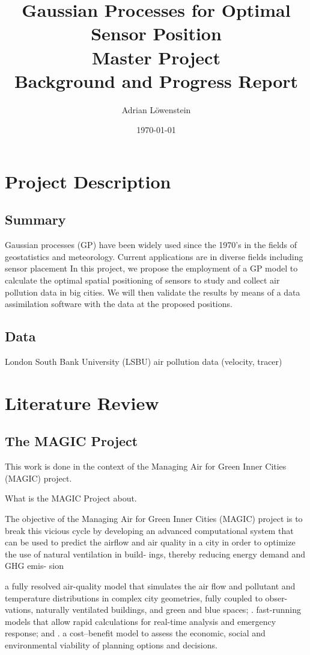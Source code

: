 \documentclass[11pt,a4paper]{article}
\title{Gaussian Processes for Optimal Sensor Position \\
Master Project \\
Background and Progress Report 
}							%
\author{Adrian Löwenstein}								%
\date{\today}											%
\numberwithin{equation}{section}
\begin{document}
\maketitle
\pagebreak

\section{Project Description}

\subsection{Summary}
Gaussian processes (GP) have been widely used since the 1970’s in the fields of geostatistics and meteorology. Current applications are in diverse fields including sensor placement
In this project, we propose the employment of a GP model to calculate the optimal spatial positioning of sensors to study and collect air pollution data in big cities. We will then validate the results by means of a data assimilation software with the data at the proposed positions.

\subsection{Data}
London South Bank University (LSBU) air pollution data (velocity, tracer)

\section{Literature Review}

\subsection{The MAGIC Project}

This work is done in the context of the Managing Air for Green Inner Cities (MAGIC) project. 

What is the MAGIC Project about. 

The objective of the Managing Air for Green Inner Cities (MAGIC) project is to break this vicious cycle by developing an advanced computational system that can be used to predict the airflow and air quality in a city in order to optimize the use of natural ventilation in build- ings, thereby reducing energy demand and GHG emis- sion

 a fully resolved air-quality model that simulates the air flow and pollutant and temperature distributions in complex city geometries, fully coupled to obser- vations, naturally ventilated buildings, and green and blue spaces;
. fast-running models that allow rapid calculations for real-time analysis and emergency response; and
. a cost–benefit model to assess the economic, social and environmental viability of planning options and decisions.
\cite{song_natural_2018}
\end{document}
